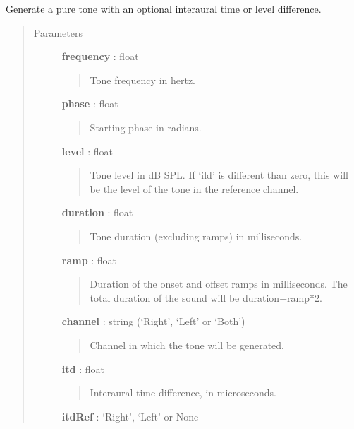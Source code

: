 \documentclass[a4paper,12pt,english]{sphinxmanual}
\begin{document}
\begin{fulllineitems}
\label{sndlib:sndlib.binauralPureTone}
Generate a pure tone with an optional interaural time or level difference.
\begin{quote}\begin{description}
\item[{Parameters }] \leavevmode
\textbf{frequency} : float
\begin{quote}

Tone frequency in hertz.
\end{quote}

\textbf{phase} : float
\begin{quote}

Starting phase in radians.
\end{quote}

\textbf{level} : float
\begin{quote}

Tone level in dB SPL. If `ild' is different than zero, this will
be the level of the tone in the reference channel.
\end{quote}

\textbf{duration} : float
\begin{quote}

Tone duration (excluding ramps) in milliseconds.
\end{quote}

\textbf{ramp} : float
\begin{quote}

Duration of the onset and offset ramps in milliseconds.
The total duration of the sound will be duration+ramp*2.
\end{quote}

\textbf{channel} : string (`Right', `Left' or `Both')
\begin{quote}

Channel in which the tone will be generated.
\end{quote}

\textbf{itd} : float
\begin{quote}

Interaural time difference, in microseconds.
\end{quote}

\textbf{itdRef} : `Right', `Left' or None
\begin{quote}


\end{quote}
\end{description}
\end{quote}
\end{fulllineitems}
\end{document}
